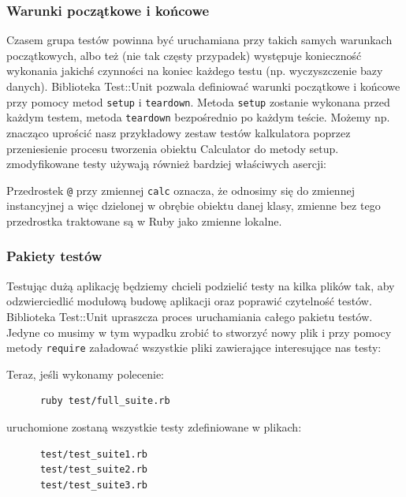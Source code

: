     \subsubsection{Warunki początkowe i końcowe}
    Czasem grupa testów powinna być uruchamiana przy takich samych warunkach początkowych, albo też (nie tak częsty przypadek) występuje konieczność wykonania jakichś czynności na koniec każdego testu (np. wyczyszczenie bazy danych). Biblioteka Test::Unit pozwala definiować warunki początkowe i końcowe przy pomocy metod \verb+setup+ i \verb+teardown+.
    Metoda \verb+setup+ zostanie wykonana przed każdym testem, metoda \verb+teardown+ bezpośrednio po każdym teście. Możemy np. znacząco uprościć nasz przykładowy zestaw testów kalkulatora poprzez przeniesienie procesu tworzenia obiektu Calculator do metody setup. zmodyfikowane testy używają również bardziej właściwych asercji:
    
    
    
    Przedrostek \verb+@+ przy zmiennej \verb+calc+ oznacza, że odnosimy się do zmiennej instancyjnej a więc dzielonej w obrębie obiektu danej klasy, zmienne bez tego przedrostka traktowane są w Ruby jako zmienne lokalne.
    
    \subsubsection{Pakiety testów}
    Testując dużą aplikację będziemy chcieli podzielić testy na kilka plików tak, aby odzwierciedlić modułową budowę aplikacji oraz poprawić czytelność testów. Biblioteka Test::Unit upraszcza proces uruchamiania całego pakietu testów. Jedyne co musimy w tym wypadku zrobić to stworzyć nowy plik i przy pomocy metody \verb+require+ załadować wszystkie pliki zawierające interesujące nas testy:
    
    
    
    Teraz, jeśli wykonamy polecenie:
    
    \begin{lstlisting} 
      ruby test/full_suite.rb
    \end{lstlisting}
    
    uruchomione zostaną wszystkie testy zdefiniowane w plikach:
    
    \begin{lstlisting} 
      test/test_suite1.rb
      test/test_suite2.rb
      test/test_suite3.rb
    \end{lstlisting}
    
